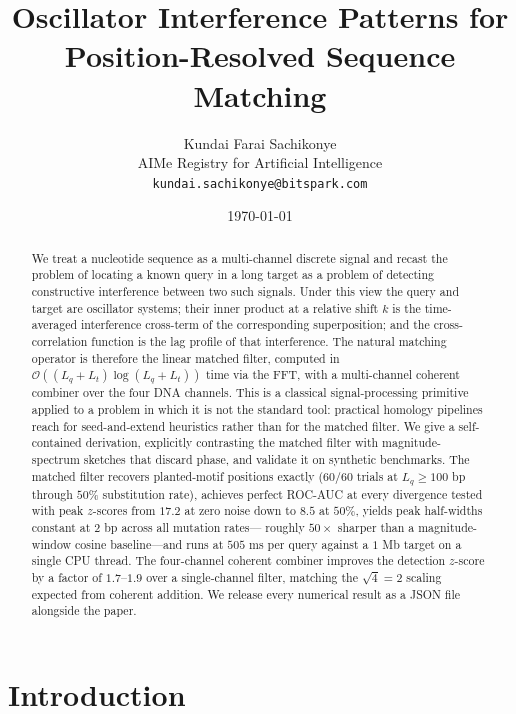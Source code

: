 \documentclass[11pt,a4paper]{article}
\title{\textbf{Oscillator Interference Patterns for\\ Position-Resolved Sequence Matching}}
\author{
Kundai Farai Sachikonye\\[0.2em]
AIMe Registry for Artificial Intelligence\\[0.2em]
\texttt{kundai.sachikonye@bitspark.com}
}
\date{\today}
\theoremstyle{definition}
\theoremstyle{remark}
\newcommand{\bigO}{\mathcal{O}}
\begin{document}
\maketitle

\begin{abstract}
\noindent
We treat a nucleotide sequence as a multi-channel discrete signal and
recast the problem of locating a known query in a long target as a
problem of detecting constructive interference between two such signals.
Under this view the query and target are oscillator systems; their
inner product at a relative shift $k$ is the time-averaged interference
cross-term of the corresponding superposition; and the cross-correlation
function is the lag profile of that interference. The natural matching
operator is therefore the linear matched filter, computed in
$\bigO((L_q + L_t) \log(L_q + L_t))$ time via the FFT, with a
multi-channel coherent combiner over the four DNA channels. This is a
classical signal-processing primitive applied to a problem in which it is
not the standard tool: practical homology pipelines reach for
seed-and-extend heuristics rather than for the matched filter.
We give a self-contained derivation, explicitly contrasting the matched
filter with magnitude-spectrum sketches that discard phase, and validate
it on synthetic benchmarks. The matched filter recovers planted-motif
positions exactly ($60/60$ trials at $L_q \geq 100$ bp through $50\%$
substitution rate), achieves perfect ROC-AUC at every divergence tested
with peak $z$-scores from $17.2$ at zero noise down to $8.5$ at $50\%$,
yields peak half-widths constant at $2$ bp across all mutation rates---
roughly $50\times$ sharper than a magnitude-window cosine baseline---and
runs at $505$ ms per query against a $1$ Mb target on a single CPU
thread. The four-channel coherent combiner improves the detection
$z$-score by a factor of $1.7$--$1.9$ over a single-channel filter,
matching the $\sqrt{4} = 2$ scaling expected from coherent addition.
We release every numerical result as a JSON file alongside the paper.
\end{abstract}

\tableofcontents

\section{Introduction}
\label{sec:intro}
\end{document}
